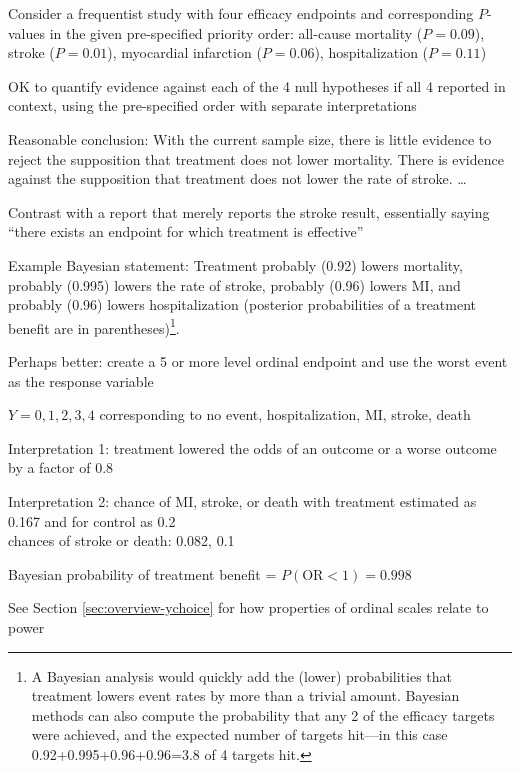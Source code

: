 Consider a frequentist study with four efficacy endpoints and corresponding $P$-values in the given pre-specified priority order: all-cause mortality ($P=0.09$), stroke ($P=0.01$), myocardial infarction ($P=0.06$), hospitalization ($P=0.11$)
\bi
\item  OK to quantify evidence against each of the 4 null hypotheses if all 4 reported in context, using the pre-specified order with separate interpretations
\item  Reasonable conclusion: With the current sample size, there is little evidence to reject the supposition that treatment does not lower mortality.  There is evidence against the supposition that treatment does not lower the rate of stroke. \ldots
\item  Contrast with a report that merely reports the stroke result, essentially saying ``there exists an endpoint for which treatment is effective''
\item Example Bayesian statement: Treatment probably (0.92) lowers mortality, probably (0.995) lowers the rate of stroke, probably (0.96) lowers MI, and probably (0.96) lowers hospitalization (posterior probabilities of a treatment benefit are in parentheses)\footnote{A Bayesian analysis would quickly add the (lower) probabilities that treatment lowers event rates by more than a trivial amount.  Bayesian methods can also compute the probability that any 2 of the efficacy targets were achieved, and the expected number of targets hit---in this case 0.92+0.995+0.96+0.96=3.8 of 4 targets hit.}.
\item Perhaps better: create a 5 or more level ordinal endpoint and use the worst event as the response variable
  \bi
  \item $Y=0, 1, 2, 3, 4$ corresponding to no event, hospitalization, MI, stroke, death
  \item Interpretation 1: treatment lowered the odds of an outcome or a worse outcome by a factor of 0.8
  \item Interpretation 2: chance of MI, stroke, or death with treatment estimated as 0.167 and for control as 0.2\\
    chances of stroke or death: 0.082, 0.1
  \item Bayesian probability of treatment benefit = $P(\textrm{OR} < 1) = 0.998$
  \ei
\item See Section \ref{sec:overview-ychoice} for how properties of ordinal scales relate to power
\ei

